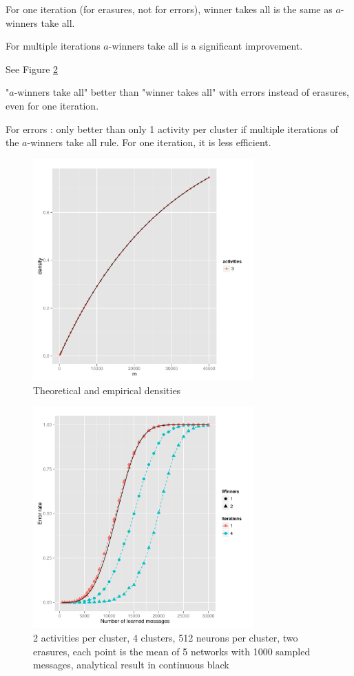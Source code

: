 \documentclass[english,11pt,twocolumn]{article}
\theoremstyle{definition}
\begin{document}
	For one iteration (for erasures, not for errors), winner takes all is the same as $a$-winners take all.
	
	For multiple iterations $a$-winners take all is a significant improvement.
	
	See Figure \ref{erasuresth}	
	
		"$a$-winners take all" better than "winner takes all" with errors instead of erasures, even for one iteration.
	
	For errors : only better than only 1 activity per cluster if multiple iterations of the $a$-winners take all rule.
	For one iteration, it is less efficient.
	\begin{figure}[!htb]
		\includegraphics[width=8.5cm]{Courbes/densiteexemple.pdf}
		\caption{Theoretical and empirical densities}
			\label{densiteth}
	\end{figure}
	
	\begin{figure}[!htb]
		\includegraphics[width=8.5cm]{Courbes/remplacement_figure2g1} %
		\caption{2 activities per cluster, 4 clusters, 512 neurons per cluster, two erasures, each point is the mean of 5 networks with 1000 sampled messages, analytical result in continuous black}
			\label{erasuresth}
		\end{figure}
		
\end{document}
